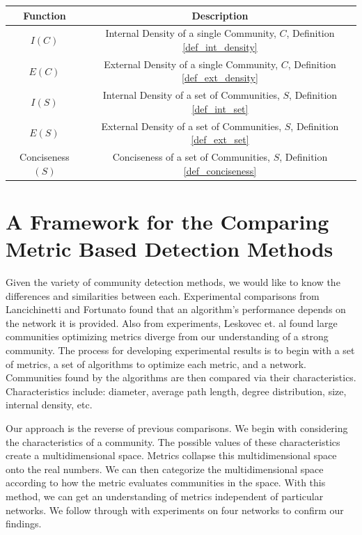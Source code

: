 \documentclass[phd,tocprelim]{cornell}
\renewcommand{\caption}[1]{\singlespacing\hangcaption{#1}\normalspacing}
\begin{document}
\begin{table}
\caption{Introduced Functions}
\begin{center}
\begin{tabular}{|c|c|} \hline
Function & Description \\ \hline
$I(C)$ & Internal Density of a single Community, $C$, Definition \ref{def_int_density} \\ \hline
$E(C)$ & External Density of a single Community, $C$, Definition  \ref{def_ext_density} \\ \hline
$I(S)$ & Internal Density of a set of Communities, $S$, Definition \ref{def_int_set} \\ \hline
$E(S)$ & External Density of a set of Communities, $S$, Definition \ref{def_ext_set} \\ \hline
{\sc Conciseness}$(S)$ & Conciseness of a set of Communities, $S$, Definition \ref{def_conciseness} \\ \hline
\end{tabular}
\end{center}
\label{table_new_functions}
\end{table}





\chapter{A Framework for the Comparing Metric Based Detection Methods}

Given the variety of community detection methods, we would like to know the differences and similarities between each.  Experimental comparisons from Lancichinetti and Fortunato \cite{lanc:2009} found that an algorithm's performance depends on the network it is provided.  Also from experiments, Leskovec et. al \cite{leskovec} found large communities optimizing metrics diverge from our understanding of a strong community.  The process for developing experimental results is to begin with a set of metrics, a set of algorithms to optimize each metric, and a network.  Communities found by the algorithms are then compared via their characteristics.  Characteristics include: diameter, average path length, degree distribution, size, internal density, etc.

Our approach is the reverse of previous comparisons.  We begin with considering the characteristics of a community.  The possible values of these characteristics create a multidimensional space.  Metrics collapse this multidimensional space onto the real numbers.  We can then categorize the multidimensional space according to how the metric evaluates communities in the space.  With this method, we can get an understanding of metrics independent of particular networks.  We follow through with experiments on four networks to confirm our findings.
\end{document}
